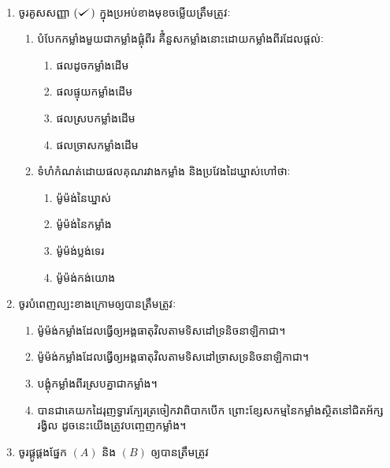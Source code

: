 \documentclass{officialexam}
\begin{document}
	\maketitle\\
	\begin{enumerate}[I]
		\item {\color{khtug}\sffamily ចូរគូសសញ្ញា $\left(\tick \right)$ ក្នុងប្រអប់ខាងមុខចម្លើយត្រឹមត្រូវៈ}
		\begin{enumerate}[m]
			\item បំបែកកម្លាំងមួយជាកម្លាំងផ្គុំពីរ គឺំនួសកម្លាំងនោះដោយកម្លាំងពីរដែលផ្តល់ៈ
			\begin{multicols}{2}
				\begin{enumerate}[bk]
					\item ផលដូចកម្លាំងដើម
					\item ផលផ្ទុយកម្លាំងដើម
					\item ផលស្របកម្លាំងដើម
					\item ផលច្រាសកម្លាំងដើម
				\end{enumerate}
			\end{multicols}
		\item ទំហំកំណត់ដោយផលគុណរវាងកម្លាំង និងប្រវែងដៃឃ្នាស់ហៅថាៈ
		\begin{multicols}{2}
			\begin{enumerate}[bk]
				\item ម៉ូម៉ង់នៃឃ្នាស់
				\item ម៉ូម៉ង់នៃកម្លាំង
				\item ម៉ូម៉ង់ប្លង់ទេរ
				\item ម៉ូម៉ង់កង់យោង
			\end{enumerate}
		\end{multicols}
		\end{enumerate}
		\item {\color{khtug}\sffamily ចូរបំពេញល្បះខាងក្រោមឲ្យបានត្រឹមត្រូវៈ}
		\begin{enumerate}[m]
			\item ម៉ូម៉ង់កម្លាំងដែលធ្វើឲ្យអង្គធាតុវិលតាមទិសដៅទ្រនិចនាឡិកាជា\dotfill ។
			\item ម៉ូម៉ង់កម្លាំងដែលធ្វើឲ្យអង្គធាតុវិលតាមទិសដៅច្រាសទ្រនិចនាឡិកាជា\dotfill ។
			\item បង្គុំកម្លាំងពីរស្របគ្នាជាកម្លាំង\dotfill។
			\item បានជាគេយកដៃរុញទ្វារក្បែរត្រចៀកវាពិបាកបើក ព្រោះខ្សែសកម្មនៃកម្លាំងស្ថិតនៅជិតអ័ក្សរង្វិល ដូចនេះយើងត្រូវបញ្ចេញកម្លាំង\dotfill។
		\end{enumerate} 
		\item {\color{khtug}\sffamily ចូរផ្គូផ្គងផ្នែក $\left(A\right)$ និង $\left(B\right)$ ឲ្យបានត្រឹមត្រូវ}\\

\end{enumerate}
\end{document}

